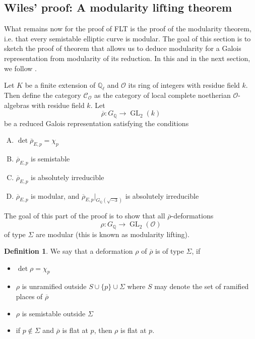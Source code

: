 \documentclass{article}
\theoremstyle{plain}%
\theoremstyle{definition}
\newtheorem{definition}[theorem]{Definition}
\theoremstyle{remark}
\newcommand{\co}{\mathcal{C}_\mathcal{O}}
\newcommand{\GL}{\operatorname{GL}}
\begin{document}
\subsection{Wiles' proof: A modularity lifting theorem}
What remains now for the proof of FLT is the proof of the modularity theorem, i.e. that every semistable
elliptic curve is modular.
The goal of this section is to sketch the proof of theorem that allows us to deduce modularity for
a Galois representation from modularity of its reduction.
In this and in the next section, we follow \cite[chapter 1, \S 7]{Cornell1997}.

Let \(K\) be a finite extension of \(\mathbb{Q}_\ell\) and \(\mathcal{O}\) its ring of integers with residue field \(k\).
Then define the category \(\co\) as the category of local complete noetherian \(\mathcal{O}\)-algebras 
with residue field \(k\).
Let
\[
    \overline{\rho}\colon G_\mathbb{Q} \to \GL_2(k)
\]
be a reduced Galois representation satisfying the conditions
\begin{enumerate}[(A)]
    \item \(\det \overline{\rho}_{E,p} = \chi_p\)
    \item \(\overline{\rho}_{E,p}\) is semistable
    \item \(\overline{\rho}_{E,p}\) is absolutely irreducible
    \item \(\overline{\rho}_{E,p}\) is modular, and \(\overline{\rho}_{E,p}|_{G_\mathbb{Q}(\sqrt{-3})}\) is absolutely irreducible
\end{enumerate}

The goal of this part of the proof is to show that all \(\overline{\rho}\)-deformations
\[
    \rho\colon G_\mathbb{Q} \to \GL_2(\mathcal{O})
\]
 of type \(\Sigma\) are modular (this is known as modularity lifting).

\begin{definition}\cite[see][chapter 1, paragraph 7.2]{Cornell1997}
We say that a deformation \(\rho\) of \(\overline{\rho}\) is of type \(\Sigma\), if
\begin{itemize}
    \item \(\det \rho = \chi_p\)
    \item \(\rho\) is unramified outside \(S \cup \{p\} \cup \Sigma\) where \(S\) 
    may denote the set of ramified places of \(\overline{\rho}\)
    \item \(\rho\) is semistable outside \(\Sigma\)
    \item if \(p \not \in \Sigma\) and \(\overline{\rho}\) is flat at \(p\), then \(\rho\) is flat at \(p\).
\end{itemize}
\end{definition}
\end{document}
